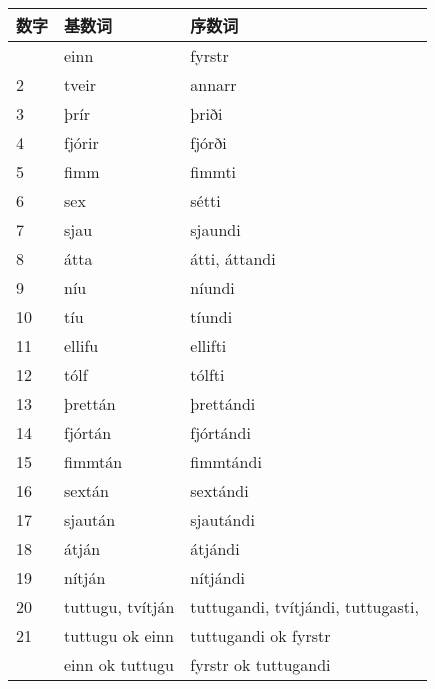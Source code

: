 {{\begin{longtable}{lll}
  \toprule
  数字 & 基数词                & 序数词                             \\
  \midrule
  \endhead
  \bottomrule
  \endfoot
  1    & einn                  & fyrstr                             \\
  2    & tveir                 & annarr                             \\
  3    & þrír                  & þriði                              \\
  4    & fjórir                & fjórði                             \\
  5    & fimm                  & fimmti                             \\
  6    & sex                   & sétti                              \\
  7    & sjau                  & sjaundi                            \\
  8    & átta                  & átti, áttandi                      \\
  9    & níu                   & níundi                             \\
  10   & tíu                   & tíundi                             \\
  11   & ellifu                & ellifti                            \\
  12   & tólf                  & tólfti                             \\
  13   & þrettán               & þrettándi                          \\
  14   & fjórtán               & fjórtándi                          \\
  15   & fimmtán               & fimmtándi                          \\
  16   & sextán                & sextándi                           \\
  17   & sjaután               & sjautándi                          \\
  18   & átján                 & átjándi                            \\
  19   & nítján                & nítjándi                           \\
  20   & tuttugu, tvítján      & tuttugandi, tvítjándi, tuttugasti, \\
  21   & tuttugu ok einn       & tuttugandi ok fyrstr               \\
       & einn ok tuttugu       & fyrstr ok tuttugandi               \\

\end{longtable}}}
